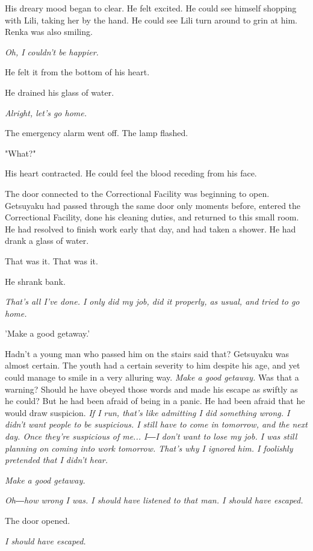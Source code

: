 His dreary mood began to clear. He felt excited. He could see himself
shopping with Lili, taking her by the hand. He could see Lili turn
around to grin at him. Renka was also smiling.

\emph{Oh, I couldn't be happier.}

He felt it from the bottom of his heart.

He drained his glass of water.

\emph{Alright, let's go home.}

The emergency alarm went off. The lamp flashed.

"What?"

His heart contracted. He could feel the blood receding from his face.

The door connected to the Correctional Facility was beginning to open.
Getsuyaku had passed through the same door only moments before, entered
the Correctional Facility, done his cleaning duties, and returned to
this small room. He had resolved to finish work early that day, and had
taken a shower. He had drank a glass of water.

That was it. That was it.

He shrank bank.

\emph{That's all I've done. I only did my job, did it properly, as usual, and
	tried to go home.}

'Make a good getaway.'

Hadn't a young man who passed him on the stairs said that? Getsuyaku was
almost certain. The youth had a certain severity to him despite his age,
and yet could manage to smile in a very alluring way. \emph{Make a good
	getaway.} Was that a warning? Should he have obeyed those words and made
his escape as swiftly as he could? But he had been afraid of being in a
panic. He had been afraid that he would draw suspicion. \emph{If I run, that's
	like admitting I did something wrong. I didn't want people to be
	suspicious. I still have to come in tomorrow, and the next day. Once
	they're suspicious of me... I―I don't want to lose my job. I was still
	planning on coming into work tomorrow. That's why I ignored him. I
	foolishly pretended that I didn't hear.}

\emph{Make a good getaway.}

\emph{Oh―how wrong I was. I should have listened to that man. I should have
	escaped.}

The door opened.

\emph{I should have escaped.}

